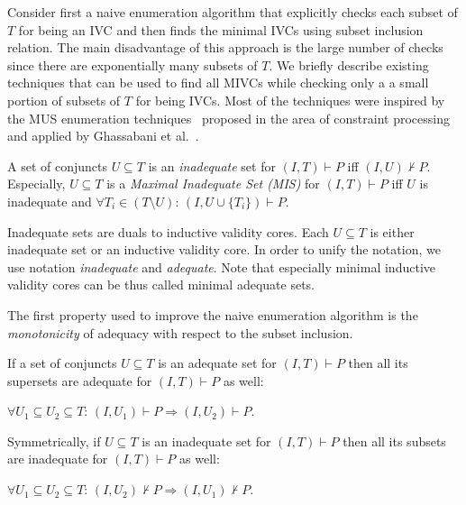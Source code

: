 \newcommand{\fUnex}{f_{\mathit{Unexplored}}}
Consider first
a naive enumeration algorithm that   explicitly checks each subset of $T$ for being an IVC  and then finds the minimal IVCs  using subset inclusion relation. The main disadvantage of this approach is the large number of checks since there are exponentially many subsets of $T$.
We briefly describe existing techniques that can be used to find all MIVCs while checking only a a small portion of subsets of $T$  for being IVCs.  Most of the techniques were inspired by the MUS enumeration techniques~\cite{Liffiton2016,DBLP:conf/sefm/BendikBBC16,DBLP:conf/fsttcs/BendikBCB16}   proposed in the area of constraint processing and applied by Ghassabani et al.~\cite{Ghass17AllIVCs,Ghass16}.


\begin{definition}[Inadequacy] A set of conjuncts  $U \subseteq T$  is an \emph{inadequate} set for $(I, T) \vdash P$ iff $(I, U) \nvdash P$. Especially, $U \subseteq T$ is a \emph{Maximal Inadequate Set (MIS)} for $(I, T) \vdash P$ iff $U$ is inadequate and $\forall T_i \in (T \setminus U): \, (I, U \cup \{ T_i\}) \vdash P$.
\end{definition}

Inadequate sets are duals to inductive validity cores. Each $U \subseteq T$ is either inadequate set or an inductive validity core. In order to unify the notation, we   use notation \emph{inadequate} and \emph{adequate}. Note that especially minimal inductive validity cores can be thus called  minimal adequate sets.



The first property used to improve the naive enumeration algorithm is the \emph{monotonicity} of  adequacy   with respect to the subset inclusion.

\begin{lemma}[Monotonicity]
\label{lemma:monotonicity}
If a set of conjuncts  $U \subseteq T$  is an adequate set for $(I, T) \vdash P$   then all its supersets are adequate for  $(I, T) \vdash P$ as well:\\ 

\vspace{-10pt}
\centerline{$\forall U_1 \subseteq U_2 \subseteq T: \, (I, U_1) \vdash P \Rightarrow (I, U_2) \vdash P$.}
\vspace{2pt}
\noindent
Symmetrically, if   $U \subseteq T$  is an inadequate set for $(I, T) \vdash P$   then all its subsets are inadequate for  $(I, T) \vdash P$ as well:\\ 

\vspace{-10pt}
\centerline{$\forall U_1 \subseteq U_2 \subseteq T: \, (I, U_2) \nvdash P \Rightarrow (I, U_1) \nvdash P$.}
\end{lemma}

